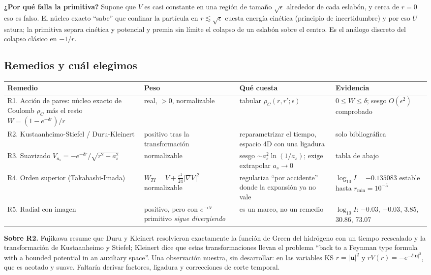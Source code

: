 \documentclass[11pt]{article}
\begin{document}
\textbf{¿Por qué falla la primitiva?} Supone que $V$ es casi constante en una región de tamaño $\sqrt\epsilon$ alrededor de cada eslabón, y cerca de $r=0$ eso es falso. El núcleo exacto ``sabe'' que confinar la partícula en $r\lesssim\sqrt\epsilon$ cuesta energía cinética (principio de incertidumbre) y por eso $U$ satura; la primitiva separa cinética y potencial y premia sin límite el colapso de un eslabón sobre el centro. Es el análogo discreto del colapso clásico en $-1/r$.

\subsection{Remedios y cuál elegimos}

\begin{longtable}{@{}L{3.4cm}L{2.6cm}L{4.0cm}L{3.8cm}@{}}
\toprule
\textbf{Remedio} & \textbf{Peso} & \textbf{Qué cuesta} & \textbf{Evidencia}\\
\midrule
\endhead
R1. Acción de pares: núcleo exacto de Coulomb $\rho_C$ más el resto $W=(1-e^{-\delta r})/r$ & real, $>0$, normalizable & tabular $\rho_C(r,r';\epsilon)$ & $0\le W\le\delta$; sesgo $O(\epsilon^2)$ comprobado\\
R2. Kustaanheimo-Stiefel / Duru-Kleinert & positivo tras la transformación & reparametrizar el tiempo, espacio 4D con una ligadura & solo bibliográfica\\
R3. Suavizado $V_{a_s}=-e^{-\delta r}/\sqrt{r^2+a_s^2}$ & normalizable & sesgo $\sim a_s^2\ln(1/a_s)$; exige extrapolar $a_s\to0$ & tabla de abajo\\
R4. Orden superior (Takahashi-Imada) & $W_{TI}=V+\tfrac{\epsilon^2}{24}|\nabla V|^2$ normalizable & regulariza ``por accidente'' donde la expansión ya no vale & $\log_{10}I=-0.135083$ estable hasta $r_{\min}=10^{-5}$\\
R5. Radial con imagen & positivo, pero con $e^{-\epsilon V}$ primitivo \emph{sigue divergiendo} & es un marco, no un remedio & $\log_{10}I$: $-0.03$, $-0.03$, 3.85, 30.86, 73.07\\
\bottomrule
\end{longtable}

\textbf{Sobre R2.} Fujikawa resume que Duru y Kleinert resolvieron exactamente la función de Green del hidrógeno con un tiempo reescalado y la transformación de Kustaanheimo y Stiefel; Kleinert dice que estas transformaciones llevan el problema ``back to a Feynman type formula with a bounded potential in an auxiliary space''. Una observación nuestra, sin desarrollar: en las variables KS $r=|\mathbf u|^2$ y $rV(r)=-e^{-\delta|\mathbf u|^2}$, que es acotado y suave. Faltaría derivar factores, ligadura y correcciones de corte temporal.
\end{document}
